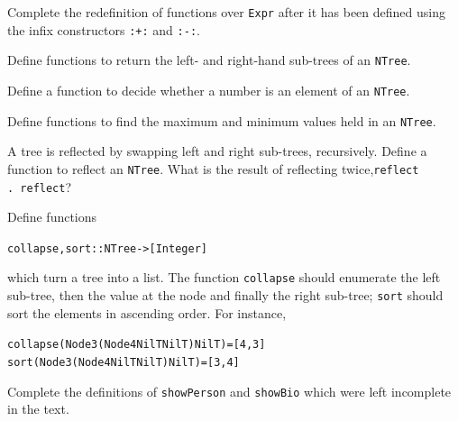 \begin{exercises}
\item
Complete the redefinition of functions over \texttt{Expr} after it has been
defined using the infix constructors \texttt{:+:} and \texttt{:-:}.

\item
Define functions to return the left- and right-hand sub-trees
of an \texttt{NTree}.

\item
Define a function to decide whether a number is an element of an \texttt{NTree}.

\item
Define functions to find the maximum and minimum values held in an 
\texttt{NTree}.

\item
A tree is reflected by swapping left and right sub-trees, recursively. Define\break
a function to reflect an \texttt{NTree}. What is the result of
reflecting twice,\break \texttt{reflect .\ reflect}?

\item
Define functions
\begin{alltt}
collapse, sort :: NTree -> [Integer]
\end{alltt}
which turn a tree into a list. The function \texttt{collapse} should enumerate the
left sub-tree, then the value at the node and finally the right sub-tree;
\texttt{sort} should sort the elements in ascending order. For instance, 
\begin{alltt}
collapse (Node 3 (Node 4 NilT NilT) NilT) = [4,3]
sort     (Node 3 (Node 4 NilT NilT) NilT) = [3,4]
\end{alltt}

\item
Complete the definitions of \texttt{showPerson} and \texttt{showBio} which were
left incomplete in the text.


\end{exercises}
